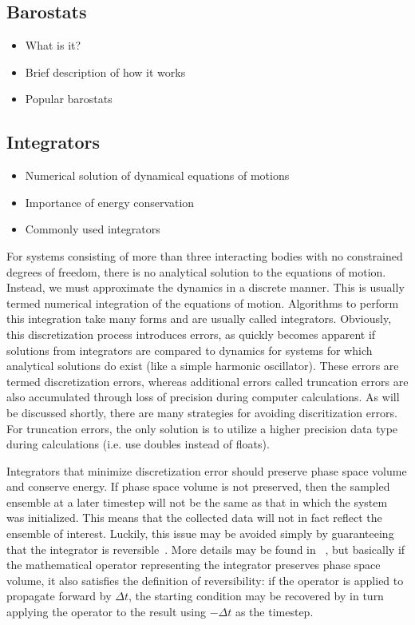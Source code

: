\documentclass[9pt,bestpractices]{livecoms}
\begin{document}
\subsection{Barostats}
\label{sec:barostats}
\begin{itemize}
\item What is it?
\item Brief description of how it works
\item Popular barostats
\end{itemize}

\subsection{Integrators}
\label{sec:integrators}
\begin{itemize}
\item Numerical solution of dynamical equations of motions
\item Importance of energy conservation
\item Commonly used integrators
\end{itemize}

For systems consisting of more than three interacting bodies with no constrained degrees of freedom, there is no analytical solution to the equations of motion.
Instead, we must approximate the dynamics in a discrete manner.
This is usually termed numerical integration of the equations of motion. 
Algorithms to perform this integration take many forms and are usually called integrators.
Obviously, this discretization process introduces errors, as quickly becomes apparent if solutions from integrators are compared to dynamics for systems for which analytical solutions do exist (like a simple harmonic oscillator).
These errors are termed discretization errors, whereas additional errors called truncation errors are also accumulated through loss of precision during computer calculations.
As will be discussed shortly, there are many strategies for avoiding discritization errors.
For truncation errors, the only solution is to utilize a higher precision data type during calculations (i.e. use doubles instead of floats).

Integrators that minimize discretization error should preserve phase space volume and conserve energy.
If phase space volume is not preserved, then the sampled ensemble at a later timestep will not be the same as that in which the system was initialized.
This means that the collected data will not in fact reflect the ensemble of interest.
Luckily, this issue may be avoided simply by guaranteeing that the integrator is reversible~\cite{Frenkel:2001:}.
More details may be found in ~\citet{Tuckerman:1992:}, but basically if the mathematical operator representing the integrator preserves phase space volume, it also satisfies the definition of reversibility: if the operator is applied to propagate forward by $\Delta t$, the starting condition may be recovered by in turn applying the operator to the result using $- \Delta t$ as the timestep.
\end{document}
